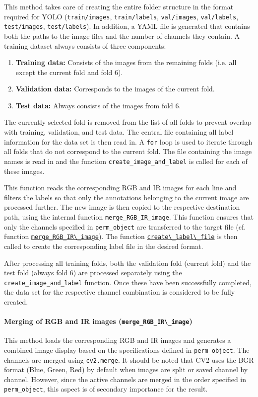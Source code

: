 This method takes care of creating the entire folder structure in the format required for \acrshort{YOLO} (\texttt{train/images}, \texttt{train/labels}, \texttt{val/images}, \texttt{val/labels}, \texttt{test/images}, \texttt{test/labels}). In addition, a \acrshort{YAML} file is generated that contains both the paths to the image files and the number of channels they contain. A training dataset always consists of three components: 
\begin{enumerate}
    \item \textbf{Training data:} Consists of the images from the remaining folds (i.e. all except the current fold and fold 6).
    \item \textbf{Validation data:} Corresponds to the images of the current fold.
    \item \textbf{Test data:} Always consists of the images from fold 6.
\end{enumerate}

The currently selected fold is removed from the list of all folds to prevent overlap with training, validation, and test data. The central file containing all label information for the data set is then read in. A \texttt{for} loop is used to iterate through all folds that do not correspond to the current fold. The file containing the image names is read in and the function \lstinline|create_image_and_label| is called for each of these images.

This function reads the corresponding \acrshort{RGB} and \acrshort{IR} images for each line and filters the labels so that only the annotations belonging to the current image are processed further. The new image is then copied to the respective destination path, using the internal function \lstinline|merge_RGB_IR_image|. This function ensures that only the channels specified in \lstinline|perm_object| are transferred to the target file (cf. function \hyperlink{par:merge_RGB_IR}{\lstinline|merge_RGB_IR\_image|}). The function \hyperlink{par:create_label_file}{\lstinline|create\_label\_file|} is then called to create the corresponding label file in the desired format.

After processing all training folds, both the validation fold (current fold) and the test fold (always fold 6) are processed separately using the \lstinline|create_image_and_label| function. Once these have been successfully completed, the data set for the respective channel combination is considered to be fully created.


\paragraph{Merging of RGB and IR images (\lstinline|merge_RGB_IR\_image|)}
\hypertarget{par:merge_RGB_IR}{}
This method loads the corresponding \acrshort{RGB} and \acrshort{IR} images and generates a combined image display based on the specifications defined in \lstinline|perm_object|. The channels are merged using \lstinline|cv2.merge|. It should be noted that \acrshort{CV2} uses the BGR format (Blue, Green, Red) by default when images are split or saved channel by channel. However, since the active channels are merged in the order specified in \lstinline|perm_object|, this aspect is of secondary importance for the result.

